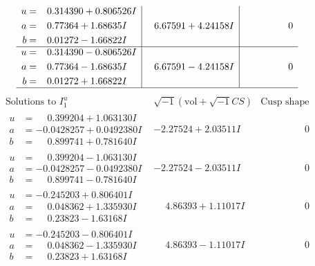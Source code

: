 \documentclass[1p]{elsarticle_modified}
\theoremstyle{definition}
\newcommand{\I}{\sqrt{-1}}
\begin{document}
$$\begin{array}{c|c|c}
\begin{aligned}
u &= \phantom{-}0.314390 + 0.806526 I \\
a &= \phantom{-}0.77364 + 1.68635 I \\
b &= \phantom{-}0.01272 - 1.66822 I\end{aligned}
 & \phantom{-}6.67591 + 4.24158 I & \phantom{-0.000000 } 0 \\ \hline\begin{aligned}
u &= \phantom{-}0.314390 - 0.806526 I \\
a &= \phantom{-}0.77364 - 1.68635 I \\
b &= \phantom{-}0.01272 + 1.66822 I\end{aligned}
 & \phantom{-}6.67591 - 4.24158 I & \phantom{-0.000000 } 0\\
 \hline 
 \end{array}$$\newpage$$\begin{array}{c|c|c}  
\text{Solutions to }I^u_{1}& \I (\text{vol} + \sqrt{-1}CS) & \text{Cusp shape}\\
 \hline 
\begin{aligned}
u &= \phantom{-}0.399204 + 1.063130 I \\
a &= -0.0428257 + 0.0492380 I \\
b &= \phantom{-}0.899741 + 0.781640 I\end{aligned}
 & -2.27524 + 2.03511 I & \phantom{-0.000000 } 0 \\ \hline\begin{aligned}
u &= \phantom{-}0.399204 - 1.063130 I \\
a &= -0.0428257 - 0.0492380 I \\
b &= \phantom{-}0.899741 - 0.781640 I\end{aligned}
 & -2.27524 - 2.03511 I & \phantom{-0.000000 } 0 \\ \hline\begin{aligned}
u &= -0.245203 + 0.806401 I \\
a &= \phantom{-}0.048362 + 1.335930 I \\
b &= \phantom{-}0.23823 - 1.63168 I\end{aligned}
 & \phantom{-}4.86393 + 1.11017 I & \phantom{-0.000000 } 0 \\ \hline\begin{aligned}
u &= -0.245203 - 0.806401 I \\
a &= \phantom{-}0.048362 - 1.335930 I \\
b &= \phantom{-}0.23823 + 1.63168 I\end{aligned}
 & \phantom{-}4.86393 - 1.11017 I & \phantom{-0.000000 } 0 \\ \hline\begin{aligned}

\end{aligned}
\end{array}$$
\end{document}
